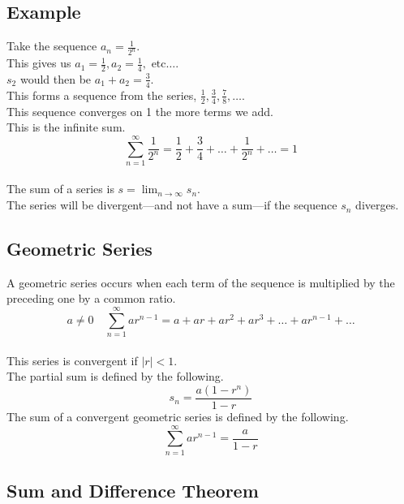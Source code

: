 \documentclass[12pt]{article}
\begin{document}
\subsection{Example}

Take the sequence $a_n = \frac{1}{2^n}$.\\
This gives us $a_1 = \frac{1}{2}, a_2 = \frac{1}{4},\text{ etc}\dots$.\\
$s_2$ would then be $a_1 + a_2 = \frac{3}{4}$.\\
This forms a sequence from the series, ${\frac{1}{2}, \frac{3}{4}, \frac{7}{8}, \dots}$.\\
This sequence converges on 1 the more terms we add.\\
This is the infinite sum.\\
\begin{displaymath}
\sum_{n=1}^{\infty} \frac{1}{2^n} = \frac{1}{2} + \frac{3}{4} + \dots + \frac{1}{2^n} + \dots = 1
\end{displaymath}
\\
The sum of a series is $s = \lim_{n\to\infty} s_n$.\\
The series will be divergent---and not have a sum---if the sequence ${s_n}$ diverges.


\subsection{Geometric Series}

A geometric series occurs when each term of the sequence is multiplied by the preceding one by a common ratio.\\
\begin{displaymath}
a \neq 0 \quad \sum_{n=1}^{\infty} ar^{n-1} = a + ar + ar^2 + ar^3 + \dots + ar^{n-1} + \dots
\end{displaymath}
\\
This series is convergent if $\left|r\right| < 1$.\\
The partial sum is defined by the following.\\
\begin{displaymath}
s_n = \frac{a(1 - r^n)}{1 - r}
\end{displaymath}
The sum of a convergent geometric series is defined by the following.\\
\begin{displaymath}
\sum_{n=1}^{\infty} ar^{n-1} = \frac{a}{1-r}
\end{displaymath}


\subsection{Sum and Difference Theorem}
\end{document}
